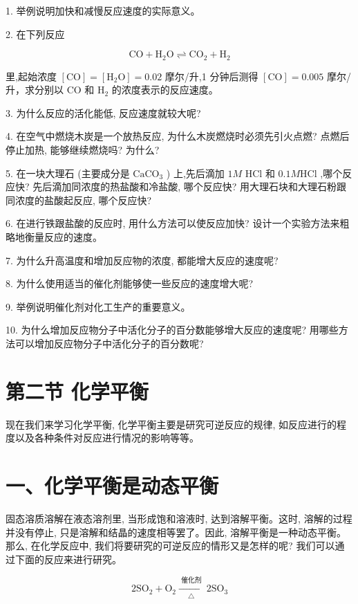 \documentclass[10pt]{article}
\begin{document}
1. 举例说明加快和减慢反应速度的实际意义。

2. 在下列反应

\[
\mathrm{{CO}} + {\mathrm{H}}_{2}\mathrm{O} \rightleftharpoons {\mathrm{{CO}}}_{2} + {\mathrm{H}}_{2}
\]

里,起始浓度 \(\left\lbrack \mathrm{{CO}}\right\rbrack = \left\lbrack {{\mathrm{H}}_{2}\mathrm{O}}\right\rbrack = {0.02}\) 摩尔/升,1 分钟后测得 \(\left\lbrack \mathrm{{CO}}\right\rbrack = {0.005}\) 摩尔/升，求分别以 \(\mathrm{{CO}}\) 和 \({\mathrm{H}}_{2}\) 的浓度表示的反应速度。

3. 为什么反应的活化能低, 反应速度就较大呢?

4. 在空气中燃烧木炭是一个放热反应, 为什么木炭燃烧时必须先引火点燃? 点燃后停止加热, 能够继续燃烧吗? 为什么?

5. 在一块大理石 (主要成分是 \({\mathrm{{CaCO}}}_{3}\) ) 上,先后滴加 \({1M}\) \(\mathrm{{HCl}}\) 和 \({0.1M}\mathrm{{HCl}}\) ,哪个反应快? 先后滴加同浓度的热盐酸和冷盐酸, 哪个反应快? 用大理石块和大理石粉跟同浓度的盐酸起反应, 哪个反应快?

6. 在进行铁跟盐酸的反应时, 用什么方法可以使反应加快? 设计一个实验方法来粗略地衡量反应的速度。

7. 为什么升高温度和增加反应物的浓度, 都能增大反应的速度呢?

8. 为什么使用适当的催化剂能够使一些反应的速度增大呢?

9. 举例说明催化剂对化工生产的重要意义。

10. 为什么增加反应物分子中活化分子的百分数能够增大反应的速度呢? 用哪些方法可以增加反应物分子中活化分子的百分数呢?

\section*{第二节 化学平衡}

现在我们来学习化学平衡, 化学平衡主要是研究可逆反应的规律, 如反应进行的程度以及各种条件对反应进行情况的影响等等。

\section*{一、化学平衡是动态平衡}

固态溶质溶解在液态溶剂里, 当形成饱和溶液时, 达到溶解平衡。这时, 溶解的过程并没有停止, 只是溶解和结晶的速度相等罢了。因此, 溶解平衡是一种动态平衡。那么, 在化学反应中, 我们将要研究的可逆反应的情形又是怎样的呢? 我们可以通过下面的反应来进行研究。

\[
2{\mathrm{{SO}}}_{2} + {\mathrm{O}}_{2}\xrightarrow[\bigtriangleup ]{\text{ 催化剂 }}2{\mathrm{{SO}}}_{3}
\]
\end{document}

